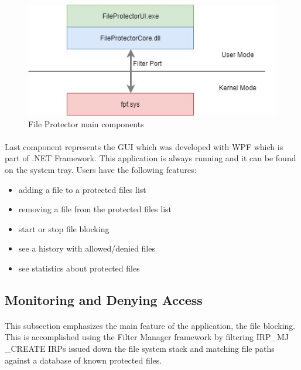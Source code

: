		\begin{figure}[h!]
			\begin{center}
				\includegraphics{images/fpMainComponents.jpg}
				\caption{File Protector main components}
				\label{fig:FPMAinComponents}
			\end{center}
		\end{figure}
		
		
		\paragraph{}
		Last component represents the GUI which was developed with WPF which is part of .NET Framework. This application is always running and it can be found on the system tray. Users have the following features:
		
		\begin{itemize}
			\item adding a file to a protected files list
			\item removing a file from the protected files list
			\item start or stop file blocking
			\item see a history with allowed/denied files
			\item see statistics about protected files
		\end{itemize}
		
		\subsection{Monitoring and Denying Access}
		\paragraph{}
		This subsection emphasizes the main feature of the application, the file blocking. This is accomplished using the Filter Manager framework by filtering IRP\_MJ \_CREATE IRPs issued down the file system stack and matching file paths against a database of known protected files. 
		
